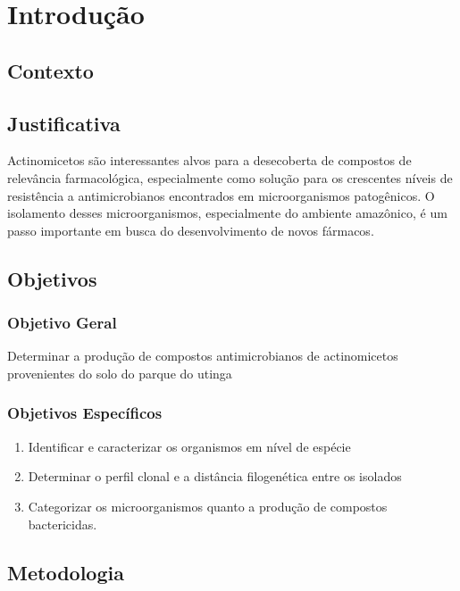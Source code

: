 \chapter{Introdução}
\label{cap:introducao}

\section{Contexto}





\section{Justificativa}
Actinomicetos são interessantes alvos para a desecoberta de compostos
de relevância farmacológica, especialmente como solução para os crescentes níveis
de resistência a antimicrobianos encontrados em microorganismos patogênicos.
O isolamento desses microorganismos, especialmente do ambiente amazônico,
é um passo importante em busca do desenvolvimento de novos fármacos.

\section{Objetivos}

\subsection{Objetivo Geral}

Determinar a produção de compostos antimicrobianos de actinomicetos
provenientes do solo do parque do utinga

\subsection{Objetivos Específicos}
\begin{enumerate}
    \item Identificar e caracterizar os organismos em nível de espécie
    \item Determinar o perfil clonal e a distância filogenética entre os isolados
    \item Categorizar os microorganismos quanto a produção de compostos bactericidas.
\end{enumerate}

\section{Metodologia}
